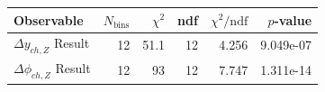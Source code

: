 \begin{tabular}{|l|r|r|r|r|r|}
\hline
Observable & $N_{\mathrm{bins}}$ & $\chi^2$ & ndf & $\chi^2/\mathrm{ndf}$ & $p$-value \\
\hline
$\Delta y_{ch,Z}$ Result & 12 & 51.1 & 12 & 4.256 & 9.049e-07 \\
$\Delta\phi_{ch,Z}$ Result & 12 & 93 & 12 & 7.747 & 1.311e-14 \\
\hline
\end{tabular}
